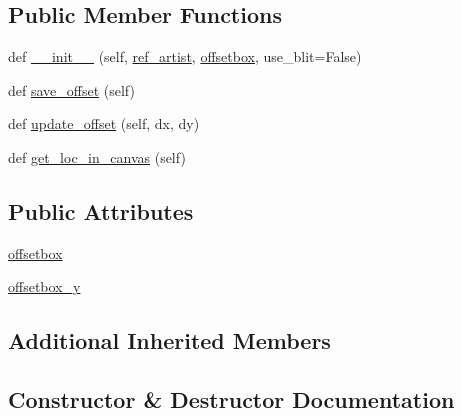 \subsection*{Public Member Functions}
\begin{DoxyCompactItemize}
\item 
def \hyperlink{classmatplotlib_1_1offsetbox_1_1DraggableOffsetBox_a2863f751c94b45c31f96a5677ce6e8ee}{\+\_\+\+\_\+init\+\_\+\+\_\+} (self, \hyperlink{classmatplotlib_1_1offsetbox_1_1DraggableBase_aee9675f921b3b97a1b75e20fc11bf8ba}{ref\+\_\+artist}, \hyperlink{classmatplotlib_1_1offsetbox_1_1DraggableOffsetBox_a0d05570e4dd2a6a439417ddb2d88ee58}{offsetbox}, use\+\_\+blit=False)
\item 
def \hyperlink{classmatplotlib_1_1offsetbox_1_1DraggableOffsetBox_a768701cc2f1b9f505392077e782003e3}{save\+\_\+offset} (self)
\item 
def \hyperlink{classmatplotlib_1_1offsetbox_1_1DraggableOffsetBox_a1d1d5ae821f90c81d4237e96b447300e}{update\+\_\+offset} (self, dx, dy)
\item 
def \hyperlink{classmatplotlib_1_1offsetbox_1_1DraggableOffsetBox_a08af0e6532a546de1ea0ea349c214827}{get\+\_\+loc\+\_\+in\+\_\+canvas} (self)
\end{DoxyCompactItemize}
\subsection*{Public Attributes}
\begin{DoxyCompactItemize}
\item 
\hyperlink{classmatplotlib_1_1offsetbox_1_1DraggableOffsetBox_a0d05570e4dd2a6a439417ddb2d88ee58}{offsetbox}
\item 
\hyperlink{classmatplotlib_1_1offsetbox_1_1DraggableOffsetBox_ae475d38728bed8a0f11a7c82df82c048}{offsetbox\+\_\+y}
\end{DoxyCompactItemize}
\subsection*{Additional Inherited Members}


\subsection{Constructor \& Destructor Documentation}
\mbox{\label{classmatplotlib_1_1offsetbox_1_1DraggableOffsetBox_a2863f751c94b45c31f96a5677ce6e8ee}} 
